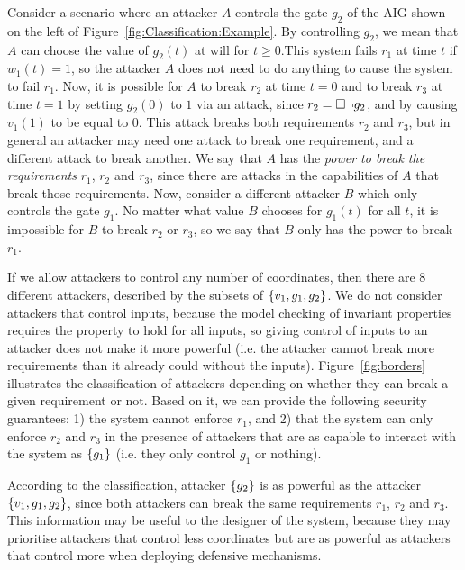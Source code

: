 Consider a scenario where an attacker $A$ controls the gate $g_2$ of the AIG shown on the left of Figure~\ref{fig:Classification:Example}. By controlling $g_2$, we mean that $A$ can choose the value of $g_2(t)$ at will for $t\geq 0$.This system fails $r_1$ at time $t$ if $w_1(t)=1$, so the attacker $A$ does not need to do anything to cause the system to fail $r_1$. Now, it is possible for $A$ to break $r_2$ at time $t=0$ and to break $r_3$ at time $t=1$ by setting $g_2(0)$ to $1$ via an attack, since $r_2={{\square}} \lnot g_2$, and by causing $v_1(1)$ to be equal to $0$. This attack breaks both requirements $r_2$ and $r_3$, but in general an attacker may need one attack to break one requirement, and a different attack to break another. We say that $A$ has the \emph{power to break the requirements} $r_1$, $r_2$ and $r_3$, since there are attacks in the capabilities of $A$ that break those requirements. Now, consider a different attacker $B$ which only controls the gate $g_1$. No matter what value $B$ chooses for $g_1(t)$ for all $t$, it is impossible for $B$ to break $r_2$ or $r_3$, so we say that $B$ only has the power to break $r_1$. 



If we allow attackers to control any number of coordinates, then there are $8$ different attackers, described by the subsets of $\left\{v_1,g_1,g_2\right\}$. We do not consider attackers that control inputs, because the model checking of invariant properties requires the property to hold for all inputs, so giving control of inputs to an attacker does not make it more powerful (i.e. the attacker cannot break more requirements than it already could without the inputs). Figure~\ref{fig:borders} illustrates the classification of attackers depending on whether they can break a given requirement or not. Based on it, we can provide the following security guarantees: 1) the system cannot enforce $r_1$, and 2) that the system can only enforce $r_2$ and $r_3$ in the presence of attackers that are as capable to interact with the system as $\left\{g_1\right\}$ (i.e. they only control $g_1$ or nothing).

According to the classification, attacker $\left\{g_2\right\}$ is as powerful as the attacker $\left\{v_1,g_1,g_2\right\}$, since both attackers can break the same requirements $r_1$, $r_2$ and $r_3$. This information may be useful to the designer of the system, because they may prioritise attackers that control less coordinates but are as powerful as attackers that control more when deploying defensive mechanisms.

